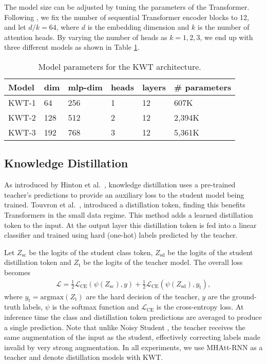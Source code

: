 \documentclass[a4paper]{article}
\begin{document}
The model size can be adjusted by tuning the parameters of the Transformer. Following \cite{touvron2020training}, we fix the number of sequential Transformer encoder blocks to 12, and let $d/k = 64$, where $d$ is the embedding dimension and $k$ is the number of attention heads. By varying the number of heads as $k = 1, 2, 3$, we end up with three different models as shown in Table \ref{tab:params}.

\begin{table}[t]
	\caption{Model parameters for the KWT architecture.}
	\label{tab:params}
	\centering
	\begin{tabular}{llllll}
	\toprule
	\textbf{Model} & dim & mlp-dim & heads & layers &  \# parameters \\
	\midrule
	KWT-1 & 64 & 256 & 1 & 12 & 607K \\
	KWT-2 & 128 & 512 & 2 & 12 & 2,394K \\
	KWT-3 & 192 & 768 & 3 & 12 & 5,361K \\
	\bottomrule
	\end{tabular}
\end{table}

\subsection{Knowledge Distillation}

As introduced by Hinton et al.\ \cite{hinton2015distill}, knowledge distillation uses a pre-trained teacher's predictions to provide an auxiliary loss to the student model being trained. Touvron et al.\ \cite{touvron2020training}, introduced a distillation token, finding this benefits Transformers in the small data regime. This method adds a learned distillation token to the input. At the output layer this distillation token is fed into a linear classifier and trained using hard (one-hot) labels predicted by the teacher.

Let $Z_\mathrm{sc}$ be the logits of the student class token, $Z_\mathrm{sd}$ be the logits of the student distillation token and $Z_\mathrm{t}$ be the logits of the teacher model. The overall loss becomes
\begin{align}
    \mathcal{L} = \frac{1}{2}\mathcal{L}_\mathrm{CE}(\psi(Z_\mathrm{sc}),y) + \frac{1}{2}\mathcal{L}_\mathrm{CE}(\psi(Z_\mathrm{sd}),y_\mathrm{t}),
\end{align}
where $y_\mathrm{t}=\mathrm{argmax}(Z_\mathrm{t})$ are the hard decision of the teacher, $y$ are the ground-truth labels, $\psi$ is the softmax function and $\mathcal{L}_\mathrm{CE}$ is the cross-entropy loss. At inference time the class and distillation token predictions are averaged to produce a single prediction. Note that unlike Noisy Student \cite{xie2020student}, the teacher receives the same augmentation of the input as the student, effectively correcting labels made invalid by very strong augmentation. In all experiments, we use MHAtt-RNN as a teacher and denote distillation models with KWT\alembic.
\end{document}
